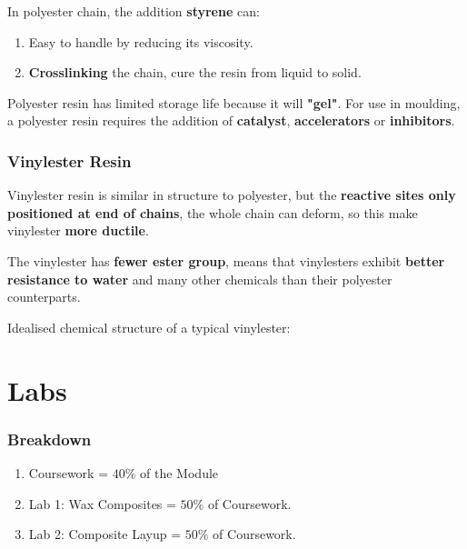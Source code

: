 \documentclass{NoteThesis/note-thesis}
\begin{document}
In polyester chain, the addition \textbf{styrene} can:

\begin{enumerate}
    \item Easy to handle by reducing its viscosity.
    \item \textbf{Crosslinking} the chain, cure the resin from liquid to solid.
\end{enumerate}

Polyester resin has limited storage life because it will \textbf{"gel"}. For use in moulding, a polyester resin requires the addition of \textbf{catalyst}, \textbf{accelerators} or \textbf{inhibitors}.

\subsubsection*{Vinylester Resin}

Vinylester resin is similar in structure to polyester, but the \textbf{reactive sites only positioned at end of chains}, the whole chain can deform, so this make vinylester \textbf{more ductile}.

The vinylester has \textbf{fewer ester group}, means that vinylesters exhibit \textbf{better resistance to water} and many other chemicals than their polyester counterparts.

Idealised chemical structure of a typical vinylester:

\vspace{1em}

\section{Labs}

\subsubsection*{Breakdown}

\begin{enumerate}
    \item Coursework = $40\%$ of the Module
    \item Lab 1: Wax Composites = $50\%$ of Coursework.
    \item Lab 2: Composite Layup = $50\%$ of Coursework.
\end{enumerate}
\end{document}

